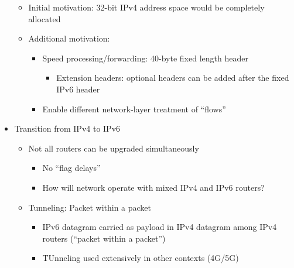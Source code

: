 \begin{itemize}
\begin{itemize}
      \item Initial motivation: 32-bit IPv4 address space would be completely allocated

      \item Additional motivation:

        \begin{itemize}

          \item Speed processing/forwarding: 40-byte fixed length header

            \begin{itemize}

              \item Extension headers: optional headers can be added after the fixed IPv6 header

            \end{itemize}

          \item Enable different network-layer treatment of ``flows''

        \end{itemize}

    \end{itemize}

  \item Transition from IPv4 to IPv6

    \begin{itemize}

      \item Not all routers can be upgraded simultaneously

        \begin{itemize}

          \item No ``flag delays''

          \item How will network operate with mixed IPv4 and IPv6 routers?

        \end{itemize}

      \item Tunneling: Packet within a packet

        \begin{itemize}

          \item IPv6 datagram carried as payload in IPv4 datagram among IPv4 routers (``packet within a packet'')

          \item TUnneling used extensively in other contexts (4G/5G)


\end{itemize}
\end{itemize}
\end{itemize}
